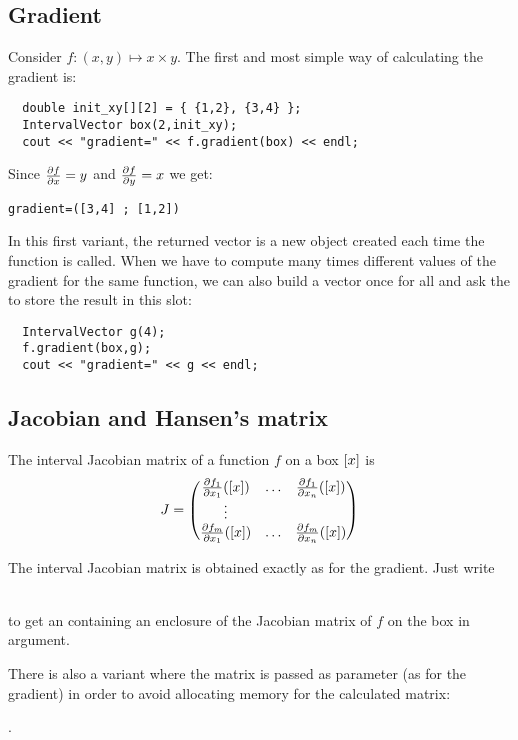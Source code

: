 \subsection{Gradient}

Consider $f:(x,y)\mapsto x\times y$.
The first and most simple way of calculating the gradient is:
\begin{lstlisting}
  double init_xy[][2] = { {1,2}, {3,4} };
  IntervalVector box(2,init_xy);
  cout << "gradient=" << f.gradient(box) << endl;
\end{lstlisting}

Since $\frac{\partial f}{\partial x}=y$ and $\frac{\partial f}{\partial y}=x$ we get:
\begin{verbatim}
gradient=([3,4] ; [1,2])
\end{verbatim}

In this first variant, the returned vector is a new object created each time the function is called.
When we have to compute many times different values of the gradient for the same function, we can
also build a vector once for all and ask the  to store the result in this slot:

\begin{lstlisting}
  IntervalVector g(4);
  f.gradient(box,g);
  cout << "gradient=" << g << endl;
\end{lstlisting}

\subsection{Jacobian and Hansen's matrix}

The interval Jacobian matrix of a function $f$ on a box $[x]$ is
$$J=\begin{pmatrix}
\frac{\partial f_1}{\partial x_1}([x]) & \ldots & \frac{\partial f_1}{\partial x_n}([x])\\
\vdots \\
\frac{\partial f_m}{\partial x_1}([x]) & \ldots & \frac{\partial f_m}{\partial x_n}([x])\\
\end{pmatrix}$$

The interval Jacobian matrix is obtained exactly as for the gradient.
Just write \\
\centerline{}\\ to get an 
containing an enclosure of the Jacobian matrix of $f$ on the box in argument.

There is also a variant where the matrix is passed as parameter
(as for the gradient) in order to avoid allocating memory for the calculated matrix:\\
\centerline{.}

